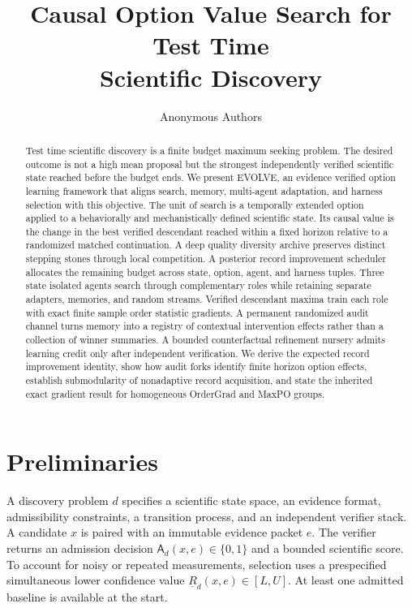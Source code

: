 \documentclass{article}
\title{Causal Option Value Search for Test Time\\Scientific Discovery}
\author{Anonymous Authors}
\date{}
\newcommand{\lcb}{\underline{R}}
\newcommand{\admit}{\mathsf{A}}
\begin{document}
\maketitle

\begin{abstract}
Test time scientific discovery is a finite budget maximum seeking problem. The desired outcome is not a high mean proposal but the strongest independently verified scientific state reached before the budget ends. We present EVOLVE, an evidence verified option learning framework that aligns search, memory, multi-agent adaptation, and harness selection with this objective. The unit of search is a temporally extended option applied to a behaviorally and mechanistically defined scientific state. Its causal value is the change in the best verified descendant reached within a fixed horizon relative to a randomized matched continuation. A deep quality diversity archive preserves distinct stepping stones through local competition. A posterior record improvement scheduler allocates the remaining budget across state, option, agent, and harness tuples. Three state isolated agents search through complementary roles while retaining separate adapters, memories, and random streams. Verified descendant maxima train each role with exact finite sample order statistic gradients. A permanent randomized audit channel turns memory into a registry of contextual intervention effects rather than a collection of winner summaries. A bounded counterfactual refinement nursery admits learning credit only after independent verification. We derive the expected record improvement identity, show how audit forks identify finite horizon option effects, establish submodularity of nonadaptive record acquisition, and state the inherited exact gradient result for homogeneous OrderGrad and MaxPO groups.
\end{abstract}

\section{Preliminaries}
\label{secpreliminaries}

A discovery problem $d$ specifies a scientific state space, an evidence format, admissibility constraints, a transition process, and an independent verifier stack. A candidate $x$ is paired with an immutable evidence packet $e$. The verifier returns an admission decision $\admit_d(x,e)\in\{0,1\}$ and a bounded scientific score. To account for noisy or repeated measurements, selection uses a prespecified simultaneous lower confidence value $\lcb_d(x,e)\in[L,U]$. At least one admitted baseline is available at the start.
\end{document}
